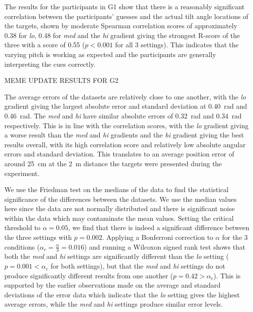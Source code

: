 \documentclass[sigconf, review=true, screen=true, anonymous=true]{acmart}
\begin{document}
The results for the participants in G1 show that there is a reasonably significant correlation between the participants' guesses and the actual tilt angle locations of the targets, shown by moderate Spearman correlation scores of approximately 0.38 for \emph{lo}, 0.48 for \emph{med} and the \emph{hi} gradient giving the strongest R-score of the three with a score of 0.55 ($p < 0.001$ for all 3 settings). 
This indicates that the varying pitch is working as expected and the participants are generally interpreting the cues correctly. 

MEME UPDATE RESULTS FOR G2

The average errors of the datasets are relatively close to one another, with the \emph{lo} gradient giving the largest absolute error and standard deviation at \SI{0.40}{\radian} and \SI{0.46}{\radian}. The \emph{med} and \emph{hi} have similar absolute errors of \SI{0.32}{\radian} and \SI{0.34}{\radian} respectively. This is in line with the correlation scores, with the \emph{lo} gradient giving a worse result than the \emph{med} and \emph{hi} gradients and the \emph{hi} gradient giving the best results overall, with its high correlation score and relatively low absolute angular errors and standard deviation. This translates to an average position error of around \SI{25}{\centi\meter} at the \SI{2}{\meter} distance the targets were presented during the experiment.

We use the Friedman test on the medians of the data to find the statistical significance of the differences between the datasets. We use the median values here since the data are not normally distributed and there is significant noise within the data which may contaminate the mean values. Setting the critical threshold to $\alpha=0.05$, we find that there is indeed a significant difference between the three settings with $p=0.002$. Applying a Bonferroni correction to $\alpha$ for the 3 conditions ($\alpha_c=\frac{\alpha}{3}=0.016$) and running a Wilcoxon signed rank test shows that both the \emph{med} and \emph{hi} settings are significantly different than the \emph{lo} setting ($p=0.001<\alpha_c$ for both settings), but that the \emph{med} and \emph{hi} settings do not produce significantly different results from one another ($p=0.42>\alpha_c$). This is supported by the earlier observations made on the average and standard deviations of the error data which indicate that the \emph{lo} setting gives the highest average errors, while the \emph{med} and \emph{hi} settings produce similar error levels. 
\end{document}
